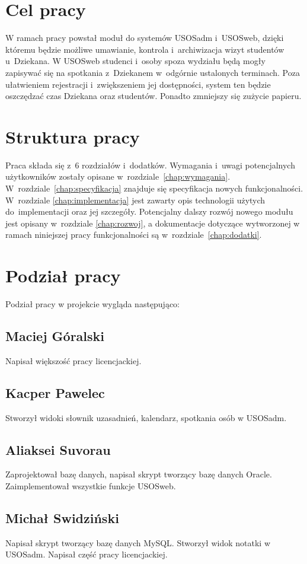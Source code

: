 \documentclass[licencjacka]{pracamgr}
\begin{document}
\section{Cel pracy}
W ramach pracy powstał moduł do systemów USOSadm i~USOSweb, dzięki któremu będzie możliwe umawianie, kontrola i~archiwizacja wizyt studentów u~Dziekana. W USOSweb studenci i~osoby spoza wydziału będą mogły zapisywać się na spotkania z~Dziekanem w~odgórnie ustalonych terminach. Poza ułatwieniem rejestracji i~zwiększeniem jej dostępności, system ten będzie oszczędzać czas Dziekana oraz studentów. Ponadto zmniejszy się zużycie papieru.
\section{Struktura pracy}
Praca składa się z~6 rozdziałów i~dodatków.
Wymagania i~uwagi potencjalnych użytkowników zostały opisane w~rozdziale~\ref{chap:wymagania}.
W~rozdziale~\ref{chap:specyfikacja} znajduje się specyfikacja nowych funkcjonalności. W~rozdziale \ref{chap:implementacja} jest zawarty opis technologii użytych do~implementacji oraz jej szczegóły. Potencjalny dalszy rozwój nowego modułu jest opisany w~rozdziale \ref{chap:rozwoj}, a dokumentacje dotyczące wytworzonej w ramach niniejszej pracy funkcjonalności są w~rozdziale~\ref{chap:dodatki}. 

\section{Podział pracy}
Podział pracy w projekcie wygląda następująco:
\subsection{Maciej Góralski}
Napisał większość pracy licencjackiej.
\subsection{Kacper Pawelec}
Stworzył widoki słownik uzasadnień, kalendarz, spotkania osób w USOSadm.
\subsection{Aliaksei Suvorau}
Zaprojektował bazę danych, napisał skrypt tworzący bazę danych Oracle. Zaimplementował wszystkie funkcje USOSweb.
\subsection{Michał Swidziński}
Napisał skrypt tworzący bazę danych MySQL. Stworzył widok notatki w USOSadm. Napisał część pracy licencjackiej.
\end{document}
